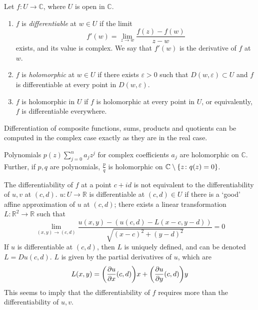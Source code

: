\begin{definition}
	Let \( f \colon U \to \mathbb C \), where \( U \) is open in \( \mathbb C \).
	\begin{enumerate}
		\item \( f \) is \textit{differentiable} at \( w \in U \) if the limit
		      \[
			      f'(w) = \lim_{z \to w} \frac{f(z) - f(w)}{z-w}
		      \]
		      exists, and its value is complex.
		      We say that \( f'(w) \) is the derivative of \( f \) at \( w \).
		\item \( f \) is \textit{holomorphic} at \( w \in U \) if there exists \( \varepsilon > 0 \) such that \( D(w, \varepsilon) \subset U \) and \( f \) is differentiable at every point in \( D(w, \varepsilon) \).
		\item \( f \) is holomorphic in \( U \) if \( f \) is holomorphic at every point in \( U \), or equivalently, \( f \) is differentiable everywhere.
	\end{enumerate}
\end{definition}

Differentiation of composite functions, sums, products and quotients can be computed in the complex case exactly as they are in the real case.

\begin{example}
	Polynomials \( p(z) \sum_{j=0}^n a_j z^j \) for complex coefficients \( a_j \) are holomorphic on \( \mathbb C \).
	Further, if \( p, q \) are polynomials, \( \frac{p}{q} \) is holomorphic on \( \mathbb C \setminus \qty{z \colon q(z) = 0} \).
\end{example}

\begin{remark}
	The differentiability of \( f \) at a point \( c + id \) is not equivalent to the differentiability of \( u, v \) at \( (c,d) \).
	\( u \colon U \to \mathbb R \) is differentiable at \( (c,d) \in U \) if there is a `good' affine approximation of \( u \) at \( (c,d) \); there exists a linear transformation \( L \colon \mathbb R^2 \to \mathbb R \) such that
	\[
		\lim_{(x,y) \to (c,d)} \frac{u(x,y) - (u(c,d)-L(x-c,y-d))}{\sqrt{(x-c)^2+(y-d)^2}} = 0
	\]
	If \( u \) is differentiable at \( (c,d) \), then \( L \) is uniquely defined, and can be denoted \( L = D u(c,d) \).
	\( L \) is given by the partial derivatives of \( u \), which are
	\[
		L(x,y) = \qty(\pdv{u}{x}\qty(c,d))x+\qty(\pdv{u}{y}\qty(c,d))y
	\]
	This seems to imply that the differentiability of \( f \) requires more than the differentiability of \( u,v \).
\end{remark}

